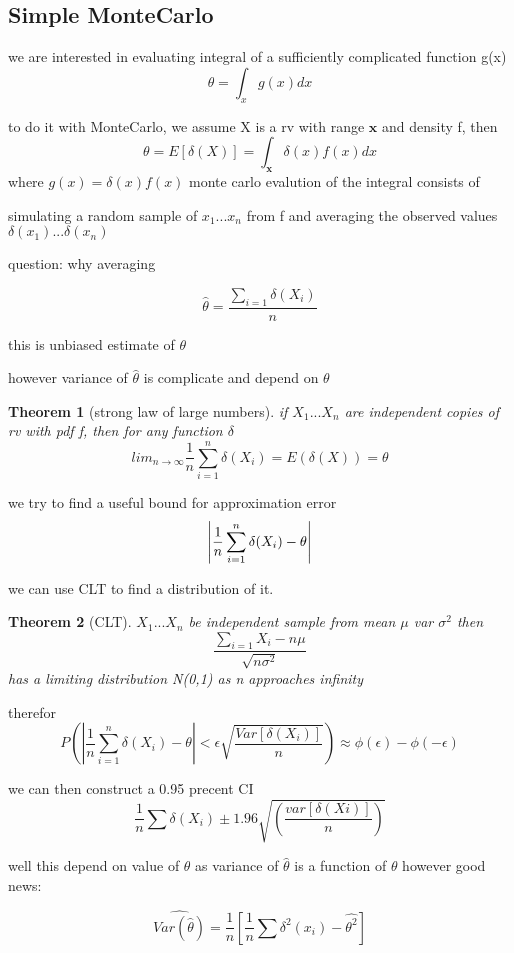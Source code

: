 \documentclass[10pt]{article}
\theoremstyle{break}
\newtheorem{thm}{Theorem}[subsection]
\begin{document}
\subsection{Simple MonteCarlo}
we are interested in evaluating integral of a sufficiently complicated function g(x)
$$\theta=\int_x g(x)dx$$

to do it with MonteCarlo, we assume X is a rv with range $\mathbf{x}$
and density f, then 
$$\theta = E[\delta(X)] = \int_\mathbf{x}\delta(x)f(x)dx$$
where $g(x)=\delta(x)f(x)$ monte carlo evalution of the integral consists of 

simulating a random sample of $x_1...x_n$ from f and averaging the observed values 
$\delta(x_1)...\delta(x_n)$

question: why averaging 

$$\hat\theta=\frac{\sum_{i=1}\delta(X_i)}{n}$$

this is unbiased estimate of $\theta$

however variance of $\hat\theta$ is complicate and depend on $\theta$
\begin{thm}[strong law of large numbers]
    if $X_1...X_n$ are independent copies of rv with pdf f, then for any function $\delta$
    $$lim_{n\rightarrow\infty}\frac{1}{n}\sum_{i=1}^n\delta(X_i)=E(\delta(X))=\theta$$
\end{thm}

we try to find a useful bound for approximation error 
$$\abs{\frac{1}{n}\sum^n_{i=1}\delta(X_i)-\theta}$$

we can use CLT to find a distribution of it.

\begin{thm}[CLT]
    $X_1...X_n$ be independent sample from mean $\mu$ var $\sigma^2$
    then $$\frac{\sum_{i=1}X_i-n\mu}{\sqrt{n\sigma^2}}$$ has a limiting distribution
    N(0,1) as n approaches infinity
\end{thm}

therefor $$P(|\frac{1}{n}\sum^n_{i=1}\delta(X_i)-\theta|<\epsilon\sqrt{\frac{Var[\delta(X_i)]}{n}})\approx 
\phi(\epsilon)-\phi(-\epsilon)$$

we can then construct a 0.95 precent CI 
$$\frac{1}{n}\sum\delta(X_i)\pm1.96\sqrt{(\frac{var[\delta(Xi)]}{n})}$$

well this depend on value of $\theta$ as variance of $\hat\theta$ is a function of $\theta$ 
however good news:

$$\hat{Var(\hat\theta)}=\frac{1}{n}[\frac{1}{n}\sum\delta^2(x_i)-\hat{\theta^2}]$$
\end{document}
